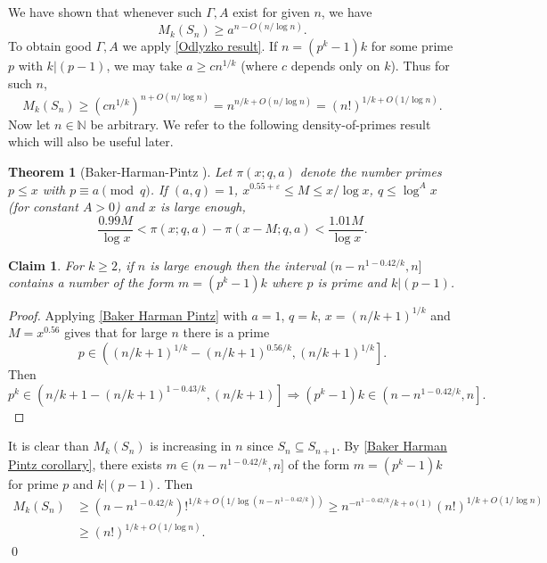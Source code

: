 \documentclass[12pt]{article}
\newtheorem{thm}{Theorem}
\newtheorem{claim}{Claim}
\begin{document}
We have shown that whenever such $\Gamma,A$ exist for given $n$, we have
$$M_k(S_n)\ge a^{n-O(n/\log n)}.$$
To obtain good $\Gamma,A$ we apply \autoref{Odlyzko result}. If $n=(p^k-1)k$ for some prime $p$ with $k|(p-1)$, we may take $a\ge cn^{1/k}$ (where $c$ depends only on $k$). Thus for such $n$,
$$M_k(S_n)\ge (cn^{1/k})^{n+O(n/\log n)}=n^{n/k+O(n/\log n)}=(n!)^{1/k+O(1/\log n)}.$$
Now let $n\in\mathbb N$ be arbitrary. We refer to the following density-of-primes result which will also be useful later.
\begin{thm}[Baker-Harman-Pintz \cite{baker1996exceptional}] \label{Baker Harman Pintz}
    Let $\pi(x;q,a)$ denote the number primes $p\le x$ with $p\equiv a\pmod q$. If $(a,q)=1$, $x^{0.55+\varepsilon}\le M\le x/\log x$, $q\le\log^Ax$ (for constant $A>0$) and $x$ is large enough,
    $$\frac{0.99 M}{\log x}<\pi(x;q,a)-\pi(x-M;q,a)<\frac{1.01M}{\log x}.$$
    \end{thm}
    \begin{claim} \label{Baker Harman Pintz corollary}
    For $k\ge 2$, if $n$ is large enough then the interval $(n-n^{1-0.42/k},n]$ contains a number of the form $m=(p^k-1)k$ where $p$ is prime and $k|(p-1)$.
    \end{claim}
    \begin{proof}
        Applying \autoref{Baker Harman Pintz} with $a=1$, $q=k$, $x=(n/k+1)^{1/k}$ and $M=x^{0.56}$ gives that for large $n$ there is a prime
        $$p\in\left((n/k+1)^{1/k}-(n/k+1)^{0.56/k},(n/k+1)^{1/k}\right].$$
        Then
        $$p^k\in \left(n/k+1-(n/k+1)^{1-0.43/k},(n/k+1)\right]\Longrightarrow(p^k-1)k\in\left(n-n^{1-0.42/k},n\right].$$
    \end{proof} It is clear than $M_k(S_n)$ is increasing in $n$ since $S_n\subseteq S_{n+1}$. By \autoref{Baker Harman Pintz corollary}, there exists $m\in(n-n^{1-0.42/k},n]$ of the form $m=(p^k-1)k$ for prime $p$ and $k|(p-1)$. Then
$$\begin{aligned}
    M_k(S_n)&\ge (n-n^{1-0.42/k})!^{1/k+O(1/\log(n-n^{1-0.42/k}))}\ge n^{-n^{1-0.42/k}/k+o(1)}(n!)^{1/k+O(1/\log n)}\\
    &\ge(n!)^{1/k+O(1/\log n)}.
\end{aligned}$$
\qed
\end{document}
